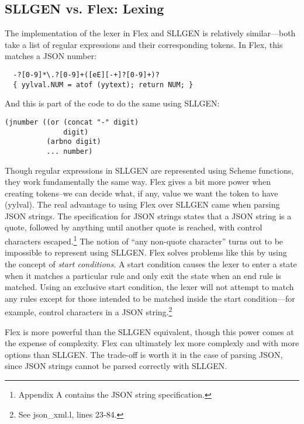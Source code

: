 \documentclass[12pt]{article}
\begin{document}
\subsection{SLLGEN vs. Flex: Lexing}
The implementation of the lexer in Flex and SLLGEN is relatively
similar---both take a list of regular expressions and their
corresponding tokens.  In Flex, this matches a JSON number:
\begin{lstlisting}
  -?[0-9]*\.?[0-9]+([eE][-+]?[0-9]+)?
  { yylval.NUM = atof (yytext); return NUM; }
\end{lstlisting}
And this is part of the code to do the same using SLLGEN:
\begin{lstlisting}
(jnumber ((or (concat "-" digit)
              digit)
          (arbno digit)
          ... number)
\end{lstlisting}
\par
Though regular expressions in SLLGEN are represented using Scheme
functions, they work fundamentally the same way.  Flex gives a bit
more power when creating tokens--we can decide what, if any, value we
want the token to have (yylval).  The real advantage to using Flex
over SLLGEN came when parsing JSON strings.  The specification for
JSON strings states that a JSON string is a quote, followed by
anything until another quote is reached, with control characters
escaped.\footnote{Appendix A contains the JSON string specification.}
The notion of ``any non-quote character'' turns out to be impossible
to represent using SLLGEN.  Flex solves problems like this by using
the concept of \textit{start conditions}.\cite[10]{flex} A start
condition causes the lexer to enter a state when it matches a
particular rule and only exit the state when an end rule is matched.
Using an exclusive start condition, the lexer will not attempt to
match any rules except for those intended to be matched inside the
start condition---for example, control characters in a JSON
string.\footnote{See json\_xml.l, lines 23-84.}\par
Flex is more powerful than the SLLGEN equivalent, though this power
comes at the expense of complexity.  Flex can ultimately lex more
complexly and with more options than SLLGEN.  The trade-off is worth
it in the case of parsing JSON, since JSON strings cannot be parsed
correctly with SLLGEN.
\end{document}

